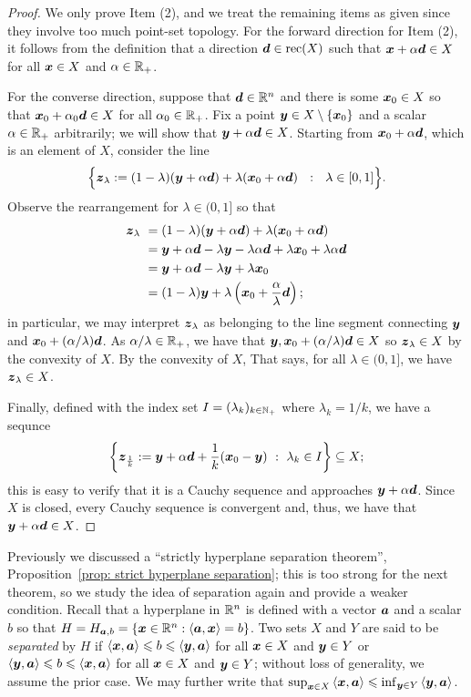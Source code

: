 \begin{proof}
We only prove Item (2), and we treat the remaining items as given since they involve too much point-set topology. For the forward direction for Item (2), it follows from the definition that a direction ${\boldsymbol d}\in\operatorname{rec}(X)$ such that ${\boldsymbol x} +\alpha{\boldsymbol d} \in X$ for all ${\boldsymbol x}\in X$ and $\alpha\in\mathbb R_+$. 

For the converse direction, suppose that ${\boldsymbol d}\in\mathbb R^n$ and there is some ${\boldsymbol x}_0\in X$ so that ${\boldsymbol x}_0 + \alpha_0 {\boldsymbol d} \in X$ for all $\alpha_0\in\mathbb R_+$. Fix a point ${\boldsymbol y}\in X\setminus\{{\boldsymbol x}_0\}$ and a scalar $\alpha\in\mathbb R_+$ arbitrarily; we will show that ${\boldsymbol y} + \alpha {\boldsymbol d} \in X$. Starting from ${\boldsymbol x}_0 + \alpha {\boldsymbol d}$, which is an element of $X$, consider the line 
\[ \Big\{{\boldsymbol z}_\lambda := (1-\lambda) ({\boldsymbol y} + \alpha {\boldsymbol d}) + \lambda ({\boldsymbol x}_0 + \alpha {\boldsymbol d}) ~~:~~ \lambda\in [0, 1]\Big\}. \]
Observe the rearrangement for $\lambda\in(0, 1]$ so that 
\begin{equation*}\begin{split}
{\boldsymbol z}_\lambda ~ & = (1-\lambda) ({\boldsymbol y} + \alpha {\boldsymbol d}) + \lambda ({\boldsymbol x}_0 + \alpha {\boldsymbol d}) \\ 
& =  {\boldsymbol y} + \alpha {\boldsymbol d}-\lambda{\boldsymbol y} - \lambda\alpha {\boldsymbol d}  + \lambda {\boldsymbol x}_0 + \lambda\alpha {\boldsymbol d} \\
& =  {\boldsymbol y} + \alpha {\boldsymbol d}-\lambda{\boldsymbol y}  + \lambda {\boldsymbol x}_0 \\
& = ( 1 - \lambda ) {\boldsymbol y} + \lambda \left({\boldsymbol x}_0 + \frac{\alpha}{\lambda} {\boldsymbol d}\right); 
\end{split}\end{equation*}
in particular, we may interpret ${\boldsymbol z}_\lambda$ as belonging to the line segment connecting ${\boldsymbol y}$ and ${\boldsymbol x}_0 + (\alpha/ \lambda){\boldsymbol d}$. As $\alpha/\lambda\in\mathbb R_+$, we have that ${\boldsymbol y}, {\boldsymbol x}_0 + (\alpha/ \lambda){\boldsymbol d}  \in X$ so ${\boldsymbol z}_\lambda\in X$ by the convexity of $X$.
By the convexity of $X$,
That says, for all $\lambda\in (0, 1]$, we have ${\boldsymbol z}_\lambda\in X$. 

Finally, defined with the index set $I = ( \lambda_k)_{k\in\mathbb N_+}$ where $\lambda_k = 1/k$, we have a sequnce 
\[\left\{{\boldsymbol z}_{\frac1k}:= {\boldsymbol y} + \alpha {\boldsymbol d}  + \frac{1}{k} ({\boldsymbol x}_0 - {\boldsymbol y}) ~:~ \lambda_k\in I \right\} \subseteq X; \] this is easy to verify that it is a Cauchy sequence and approaches ${\boldsymbol y} + \alpha{\boldsymbol d}$. Since $X$ is closed, every Cauchy sequence is convergent and, thus, we have that ${\boldsymbol y} + \alpha{\boldsymbol d}\in X$. 
\end{proof}


Previously we discussed a ``strictly hyperplane separation theorem'', Proposition~\ref{prop: strict hyperplane separation}; this is too strong for the next theorem, so we study the idea of separation again and provide a weaker condition. Recall that a hyperplane in $\mathbb R^{n}$ is defined with a vector ${\boldsymbol a}$ and a scalar $b$ so that $H = H_{{\boldsymbol a}, b} = \{{\boldsymbol x}\in\mathbb R^{n}: \left\langle{\boldsymbol a}, {\boldsymbol x}\right\rangle = b\}$. Two sets $X$ and $Y$ are said to be {\em separated} by $H$ if $\left\langle{\boldsymbol x}, {\boldsymbol a}\right\rangle \leqslant b \leqslant \left\langle{\boldsymbol y}, {\boldsymbol a}\right\rangle$ for all ${\boldsymbol x}\in X$ and ${\boldsymbol y}\in Y$ or $\left\langle{\boldsymbol y}, {\boldsymbol a}\right\rangle \leqslant b \leqslant \left\langle{\boldsymbol x}, {\boldsymbol a}\right\rangle$ for all ${\boldsymbol x}\in X$ and ${\boldsymbol y}\in Y$; without loss of generality, we assume the prior case. We may further write that $\sup_{{\boldsymbol x}\in X}\left\langle{\boldsymbol x}, {\boldsymbol a}\right\rangle \leqslant \inf_{{\boldsymbol y} \in Y}\left\langle{\boldsymbol y}, {\boldsymbol a}\right\rangle$. 

